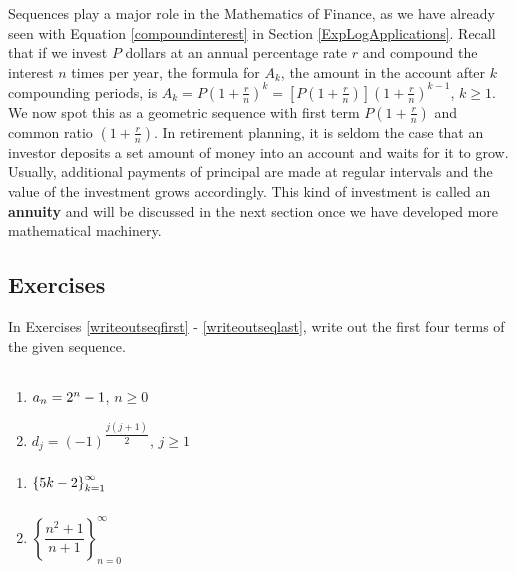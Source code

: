 \smallskip

Sequences play a major role in the Mathematics of Finance, as we have already seen with Equation \ref{compoundinterest} in Section \ref{ExpLogApplications}.  Recall that if we invest $P$ dollars at an annual percentage rate $r$ and compound the interest $n$ times per year,  the formula for $A_{k}$, the amount in the account after $k$ compounding periods, is $A_{k} = P\left(1 + \frac{r}{n}\right)^{k} = \left[P\left(1 + \frac{r}{n}\right)\right]\left(1 + \frac{r}{n}\right)^{k-1}$, $ k \geq 1$.  We now spot this as a geometric sequence with first term $P\left(1 + \frac{r}{n}\right)$ and common ratio $\left(1 + \frac{r}{n}\right)$.  In retirement planning, it is seldom the case that an investor deposits a set amount of money into an account and waits for it to grow.  Usually, additional payments of principal are made at regular intervals and the value of the investment grows accordingly.  This kind of investment is called an \textbf{annuity} and will be discussed in the next section once we have developed more mathematical machinery.

\newpage

\subsection{Exercises}

In Exercises \ref{writeoutseqfirst} - \ref{writeoutseqlast},  write out the first four terms of the given sequence.

\begin{multicols}{2}
\begin{enumerate}


\item $a_{n} = 2^{n} - 1 \vphantom{d_{j} = (-1)^{\dfrac{j(j+1)}{2}}}$, $n \geq 0$  \label{writeoutseqfirst}
\item $d_{j} = (-1)^{\dfrac{j(j+1)}{2}}$, $j \geq 1$

\setcounter{HW}{\value{enumi}}
\end{enumerate}
\end{multicols}

\begin{multicols}{2}
\begin{enumerate}
\setcounter{enumi}{\value{HW}}

\item $\left\{ 5k - 2 \right\}_{k=1}^{\infty} \vphantom{\left\{ \dfrac{n^2+1}{n+1} \right\}_{n=0}^{\infty}}$
\item $\left\{ \dfrac{n^2+1}{n+1} \right\}_{n=0}^{\infty}$

\setcounter{HW}{\value{enumi}}
\end{enumerate}
\end{multicols}

